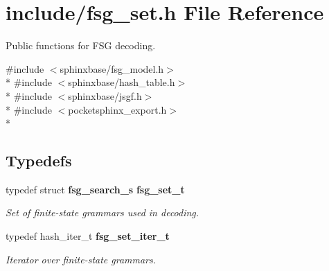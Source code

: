 \section{include/fsg\-\_\-set.h File Reference}
\label{fsg__set_8h}


Public functions for F\-S\-G decoding.  


{\ttfamily \#include $<$sphinxbase/fsg\-\_\-model.\-h$>$}\\*
{\ttfamily \#include $<$sphinxbase/hash\-\_\-table.\-h$>$}\\*
{\ttfamily \#include $<$sphinxbase/jsgf.\-h$>$}\\*
{\ttfamily \#include $<$pocketsphinx\-\_\-export.\-h$>$}\\*
\subsection*{Typedefs}
\begin{DoxyCompactItemize}
\item 
typedef struct {\bf fsg\-\_\-search\-\_\-s} {\bf fsg\-\_\-set\-\_\-t}\label{fsg__set_8h_a2af506620f0690db7ed8b09719532e4c}

\begin{DoxyCompactList}\small\item\em Set of finite-\/state grammars used in decoding. \end{DoxyCompactList}\item 
typedef hash\-\_\-iter\-\_\-t {\bf fsg\-\_\-set\-\_\-iter\-\_\-t}\label{fsg__set_8h_abb8eed644c915f0599dc2cce38767b70}

\begin{DoxyCompactList}\small\item\em Iterator over finite-\/state grammars. \end{DoxyCompactList}\end{DoxyCompactItemize}
